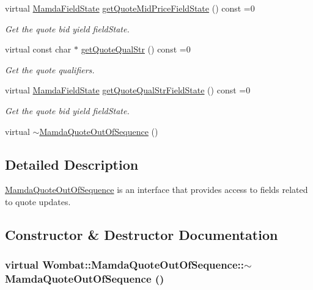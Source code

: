 \begin{CompactItemize}
virtual \hyperlink{namespaceWombat_93aac974f2ab713554fd12a1fa3b7d2a}{Mamda\-Field\-State} \hyperlink{classWombat_1_1MamdaQuoteOutOfSequence_52c9ce74d5b5b74fd48280cac925ce8d}{get\-Quote\-Mid\-Price\-Field\-State} () const =0
\begin{CompactList}\small\item\em Get the quote bid yield field\-State. \item\end{CompactList}\item 
virtual const char $\ast$ \hyperlink{classWombat_1_1MamdaQuoteOutOfSequence_0207954904250e999a94c275c9b77192}{get\-Quote\-Qual\-Str} () const =0
\begin{CompactList}\small\item\em Get the quote qualifiers. \item\end{CompactList}\item 
virtual \hyperlink{namespaceWombat_93aac974f2ab713554fd12a1fa3b7d2a}{Mamda\-Field\-State} \hyperlink{classWombat_1_1MamdaQuoteOutOfSequence_d8ffb3eab13dd519e846dc59c387924b}{get\-Quote\-Qual\-Str\-Field\-State} () const =0
\begin{CompactList}\small\item\em Get the quote bid yield field\-State. \item\end{CompactList}\item 
virtual \hyperlink{classWombat_1_1MamdaQuoteOutOfSequence_84b6ed957eeba1ee76ca3a60eb1533dd}{$\sim$Mamda\-Quote\-Out\-Of\-Sequence} ()
\end{CompactItemize}


\subsection{Detailed Description}
\hyperlink{classWombat_1_1MamdaQuoteOutOfSequence}{Mamda\-Quote\-Out\-Of\-Sequence} is an interface that provides access to fields related to quote updates. 



\subsection{Constructor \& Destructor Documentation}
\hypertarget{classWombat_1_1MamdaQuoteOutOfSequence_84b6ed957eeba1ee76ca3a60eb1533dd}{
\subsubsection[$\sim$MamdaQuoteOutOfSequence]{\setlength{\rightskip}{0pt plus 5cm}virtual Wombat::Mamda\-Quote\-Out\-Of\-Sequence::$\sim$Mamda\-Quote\-Out\-Of\-Sequence ()}}
\label{classWombat_1_1MamdaQuoteOutOfSequence_84b6ed957eeba1ee76ca3a60eb1533dd}




